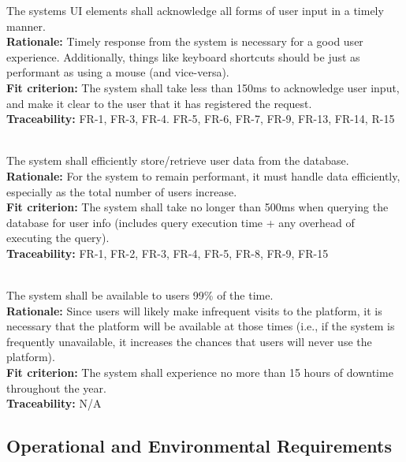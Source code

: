 \documentclass[12pt, titlepage]{article}
\newcounter{NFR_Counter}
\newcounter{FR_Counter}
\begin{document}
The systems UI elements shall acknowledge all forms of user input in a timely manner.\\
\textbf{Rationale:}
Timely response from the system is necessary for a good user experience. Additionally, things like keyboard
shortcuts should be just as performant as using a mouse (and vice-versa).\\
\textbf{Fit criterion:}
The system shall take less than 150ms to acknowledge user input, and make it clear to the user that it has registered the request.\\
\textbf{Traceability:}
FR-1, FR-3, FR-4. FR-5, FR-6, FR-7, FR-9, FR-13, FR-14, R-15 \\~\\
\addtocounter{NFR_Counter}{1}

The system shall efficiently store/retrieve user data from the database.\\
\textbf{Rationale:}
For the system to remain performant, it must handle data efficiently, especially as the total number of users increase.\\
\textbf{Fit criterion:}
The system shall take no longer than 500ms when querying the database for user info (includes query execution time + any overhead of executing 
the query).\\
\textbf{Traceability:}
FR-1, FR-2, FR-3, FR-4, FR-5, FR-8, FR-9, FR-15 \\~\\
\addtocounter{NFR_Counter}{1}

The system shall be available to users 99\% of the time.\\
\textbf{Rationale:}
Since users will likely make infrequent visits to the platform, it is necessary that the platform will be available at those 
times (i.e., if the system is frequently unavailable, it increases the chances that users will never use the platform).\\
\textbf{Fit criterion:}
The system shall experience no more than 15 hours of downtime throughout the year.\\
\textbf{Traceability:}
N/A
\addtocounter{NFR_Counter}{1}

\subsection{Operational and Environmental Requirements}
\end{document}

